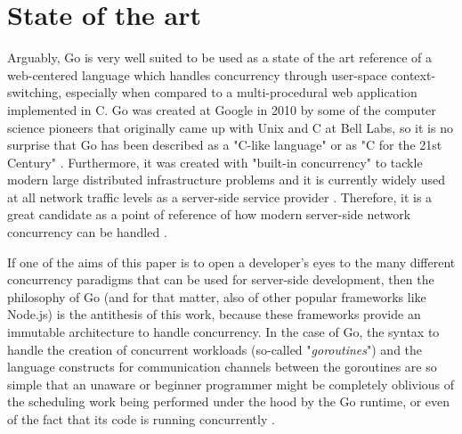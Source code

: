 \section{State of the art}
Arguably, Go is very well suited to be used as a state of the art reference of a web-centered language which handles concurrency through user-space context-switching, especially when compared to a multi-procedural web application implemented in C. Go was created at Google in 2010 by some of the computer science pioneers that originally came up with Unix and C at Bell Labs, so it is no surprise that Go has been described as a "C-like language" or as "C for the 21st Century" \cite{GoPL2015}. Furthermore, it was created with "built-in concurrency" to tackle modern large distributed infrastructure problems and it is currently widely used at all network traffic levels as a server-side service provider \cite{Pike2012}\cite{Ajmani2016}\cite{2022DataRacesGolang}. Therefore, it is a great candidate as a point of reference of how modern server-side network concurrency can be handled \cite{GoArticleACM}.

If one of the aims of this paper is to open a developer's eyes to the many different concurrency paradigms that can be used for server-side development, then the philosophy of Go (and for that matter, also of other popular frameworks like Node.js) is the antithesis of this work, because these frameworks provide an immutable architecture to handle concurrency. In the case of Go, the syntax to handle the creation of concurrent workloads (so-called "\textit{goroutines}") and the language constructs for communication channels between the goroutines are so simple that an unaware or beginner programmer might be completely oblivious of the scheduling work being performed under the hood by the Go runtime, or even of the fact that its code is running concurrently \cite{2022DataRacesGolang}. 

